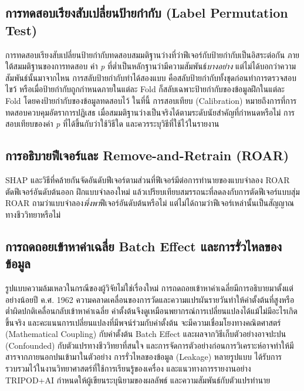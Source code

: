 \documentclass[11pt,a4paper]{article}
\begin{document}
\subsection{การทดสอบเรียงสับเปลี่ยนป้ายกำกับ (Label Permutation Test)}
การทดสอบเรียงสับเปลี่ยนป้ายกำกับทดสอบสมมติฐานว่างที่ว่าฟีเจอร์กับป้ายกำกับเป็นอิสระต่อกัน
\cite{ojala2010} ภายใต้สมมติฐานของการทดสอบ ค่า \textit{p} ที่ต่ำเป็นหลักฐานว่ามีความสัมพันธ์\textit{บางอย่าง}
แต่ไม่ได้บอกว่าความสัมพันธ์นั้นมาจากไหน การสลับป้ายกำกับทำได้สองแบบ
คือสลับป้ายกำกับทั้งชุดก่อนทำการตรวจสอบไขว้ \cite{ojala2010}
หรือเมื่อป้ายกำกับถูกกำหนดภายในแต่ละ Fold
ก็สลับเฉพาะป้ายกำกับของข้อมูลฝึกในแต่ละ Fold โดยคงป้ายกำกับของข้อมูลทดสอบไว้
ในที่นี้ การสอบเทียบ (Calibration) หมายถึงการที่การทดสอบควบคุมอัตราการปฏิเสธ
เมื่อสมมติฐานว่างเป็นจริงได้ตามระดับนัยสำคัญที่กำหนดหรือไม่
การสอบเทียบของค่า \textit{p} ที่ได้ขึ้นกับว่าใช้วิธีใด และควรระบุวิธีที่ใช้ไว้ในรายงาน

\subsection{การอธิบายฟีเจอร์และ Remove-and-Retrain (ROAR)}
SHAP และวิธีที่คล้ายกันจัดอันดับฟีเจอร์ตามส่วนที่ฟีเจอร์มีต่อการทำนายของแบบจำลอง
ROAR \cite{hooker2019} ตัดฟีเจอร์อันดับต้นออก ฝึกแบบจำลองใหม่
แล้วเปรียบเทียบสมรรถนะที่ลดลงกับการตัดฟีเจอร์แบบสุ่ม
ROAR ถามว่าแบบจำลอง\textit{พึ่งพา}ฟีเจอร์อันดับต้นหรือไม่
แต่ไม่ได้ถามว่าฟีเจอร์เหล่านั้นเป็นสัญญาณทางชีววิทยาหรือไม่

\subsection{การถดถอยเข้าหาค่าเฉลี่ย Batch Effect และการรั่วไหลของข้อมูล}
รูปแบบความล้มเหลวในกรณีของผู้วิจัยไม่ใช่เรื่องใหม่
การถดถอยเข้าหาค่าเฉลี่ยมีการอธิบายมาตั้งแต่อย่างน้อยปี ค.ศ. 1962 \cite{oldham1962}
ความคลาดเคลื่อนของการวัดและความแปรผันรายวันทำให้ค่าตั้งต้นที่สูงหรือต่ำผิดปกติเคลื่อนกลับเข้าหาค่าเฉลี่ย
ค่าตั้งต้นจึงดูเหมือนพยากรณ์การเปลี่ยนแปลงได้แม้ไม่มีอะไรเกิดขึ้นจริง
\cite{barnett2005, tu2007} และคะแนนการเปลี่ยนแปลงที่มีพจน์ร่วมกับค่าตั้งต้น
จะมีความเชื่อมโยงทางคณิตศาสตร์ (Mathematical Coupling) กับค่าตั้งต้น \cite{archie1981}
Batch Effect และผลจากวิธีเก็บตัวอย่างอาจปะปน (Confounded) กับตัวแปรทางชีววิทยาที่สนใจ
\cite{leek2010, han2022} และการจัดการตัวอย่างก่อนการวิเคราะห์อาจทำให้มีสารจากภายนอกปนเข้ามาในตัวอย่าง
\cite{bernini2011, vandersar2015} การรั่วไหลของข้อมูล (Leakage) หลายรูปแบบ
ได้รับการรวบรวมไว้ในงานวิทยาศาสตร์ที่ใช้การเรียนรู้ของเครื่อง \cite{kapoor2023}
และแนวทางการรายงานอย่าง TRIPOD+AI กำหนดให้ผู้เขียนระบุนิยามของผลลัพธ์
และความสัมพันธ์กับตัวแปรทำนาย \cite{collins2024}
\end{document}
